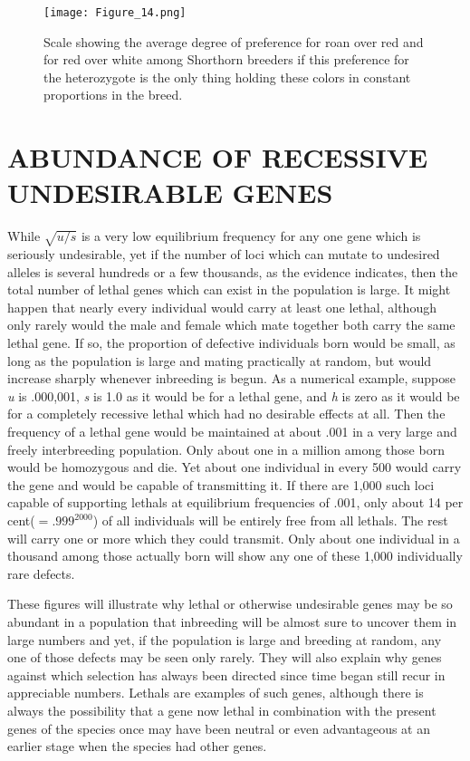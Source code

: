 \begin{wrapfigure}{L}{0.2\linewidth}
	\centering
    \texttt{[image: Figure\_14.png]}
    \caption{Scale showing the average degree of preference for roan over red and
    		 for red over white among Shorthorn breeders if this preference for the
    		 heterozygote is the only thing holding these colors in constant proportions in the breed.}
    \label{fig:Lush_Figure_14}
\end{wrapfigure}

\section*{ABUNDANCE OF RECESSIVE UNDESIRABLE GENES}

While $\sqrt{u/s}$ is a very low equilibrium frequency for any one gene
which is seriously undesirable, yet if the number of loci which can
mutate to undesired alleles is several hundreds or a few thousands, as
the evidence indicates, then the total number of lethal genes which can
exist in the population is large. It might happen that nearly every individual
would carry at least one lethal, although only rarely would the
male and female which mate together both carry the same lethal gene.
If so, the proportion of defective individuals born would be small, as
long as the population is large and mating practically at random, but
would increase sharply whenever inbreeding is begun. As a numerical
example, suppose \textit{u} is .000,001, \textit{s} is 1.0 as it would be for a lethal gene,
and \textit{h} is zero as it would be for a completely recessive lethal which had
no desirable effects at all. Then the frequency of a lethal gene would be
maintained at about .001 in a very large and freely interbreeding population.
Only about one in a million among those born would be homozygous
and die. Yet about one individual in every 500 would carry the
gene and would be capable of transmitting it. If there are 1,000 such
loci capable of supporting lethals at equilibrium frequencies of .001,
only about 14 per cent($=.999^{2000}$) of all individuals will be entirely
free from all lethals. The rest will carry one or more which they could
transmit. Only about one individual in a thousand among those actually
born will show any one of these 1,000 individually rare defects.

These figures will illustrate why lethal or otherwise undesirable
genes may be so abundant in a population that inbreeding will be
almost sure to uncover them in large numbers and yet, if the population
is large and breeding at random, any one of those defects may be
seen only rarely. They will also explain why genes against which selection
has always been directed since time began still recur in appreciable
numbers. Lethals are examples of such genes, although there is always
the possibility that a gene now lethal in combination with the present
genes of the species once may have been neutral or even advantageous
at an earlier stage when the species had other genes.

